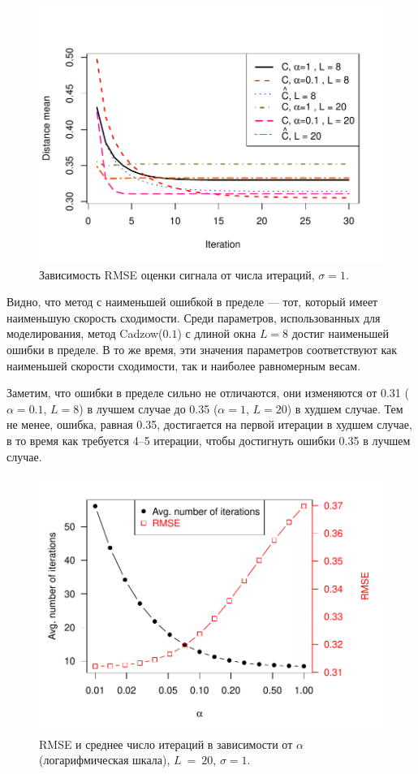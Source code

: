 \documentclass[12pt, specialist, subf,href,colorlinks=true,substylefile = spbu.rtx]{disser}
\theoremstyle{remark}
\theoremstyle{definition}
\begin{document}
\begin{figure}[!hhh]
	\includegraphics[width = \columnwidth]{cadzowspeed_2.pdf}
	\caption{Зависимость RMSE оценки сигнала от числа итераций, $\sigma = 1$.}
	\label{img_cadzowspeed2}
\end{figure}

Видно, что метод с наименьшей ошибкой в пределе --- тот, который имеет наименьшую скорость сходимости. Среди параметров, использованных для моделирования,  метод Cadzow($0.1$) с длиной окна $L=8$ достиг наименьшей ошибки в пределе. В то же время, эти значения параметров соответствуют как наименьшей скорости сходимости, так и наиболее равномерным весам.

Заметим, что ошибки в пределе сильно не отличаются, они изменяются от 0.31 ($\alpha=0.1$, $L=8$) в лучшем случае до 0.35 ($\alpha=1$, $L=20$) в худшем случае. Тем не менее, ошибка, равная 0.35, достигается на первой итерации в худшем случае, в то время как требуется 4--5 итерации, чтобы достигнуть ошибки 0.35 в лучшем случае.

\smallskip
\begin{figure}[!hhh]
	\begin{center}
	\includegraphics[width = 0.75\columnwidth]{2axis.pdf}
	\caption{RMSE и среднее число итераций в зависимости от $\alpha$ (логарифмическая шкала), $L~=~20$, $\sigma=1$.}
	\label{img_2axis}
	\end{center}
\end{figure}
\end{document}
